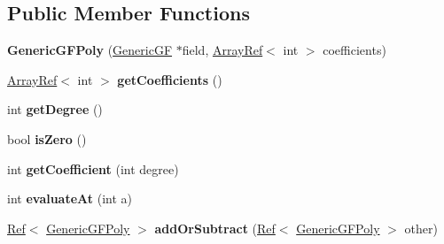 \subsection*{Public Member Functions}
\begin{DoxyCompactItemize}
\item 
\mbox{\label{classzxing_1_1_generic_g_f_poly_aaa836e22e04820d265870c2e291b5b9f}} 
{\bfseries Generic\+G\+F\+Poly} (\mbox{\hyperlink{classzxing_1_1_generic_g_f}{Generic\+GF}} $\ast$field, \mbox{\hyperlink{classzxing_1_1_array_ref}{Array\+Ref}}$<$ int $>$ coefficients)
\item 
\mbox{\label{classzxing_1_1_generic_g_f_poly_a9060a488bce5cb5e3637946e6416250b}} 
\mbox{\hyperlink{classzxing_1_1_array_ref}{Array\+Ref}}$<$ int $>$ {\bfseries get\+Coefficients} ()
\item 
\mbox{\label{classzxing_1_1_generic_g_f_poly_ab66085698f3f48fb7f55d285f1d71f79}} 
int {\bfseries get\+Degree} ()
\item 
\mbox{\label{classzxing_1_1_generic_g_f_poly_a35b5d9ae3dcccb56f5feb0b5c42cf21c}} 
bool {\bfseries is\+Zero} ()
\item 
\mbox{\label{classzxing_1_1_generic_g_f_poly_a84fc443c0348d28ee47ac78a4ca2d2fd}} 
int {\bfseries get\+Coefficient} (int degree)
\item 
\mbox{\label{classzxing_1_1_generic_g_f_poly_a5811b59ea061261c669ebba4f92616fd}} 
int {\bfseries evaluate\+At} (int a)
\item 
\mbox{\label{classzxing_1_1_generic_g_f_poly_ac2a19ab0150a0f2e8e2bb58b42adb7ab}} 
\mbox{\hyperlink{classzxing_1_1_ref}{Ref}}$<$ \mbox{\hyperlink{classzxing_1_1_generic_g_f_poly}{Generic\+G\+F\+Poly}} $>$ {\bfseries add\+Or\+Subtract} (\mbox{\hyperlink{classzxing_1_1_ref}{Ref}}$<$ \mbox{\hyperlink{classzxing_1_1_generic_g_f_poly}{Generic\+G\+F\+Poly}} $>$ other)
\item 
\mbox{\label{classzxing_1_1_generic_g_f_poly_a06f8411f62a7245daa67c711de9d318c}} 

\end{DoxyCompactItemize}
